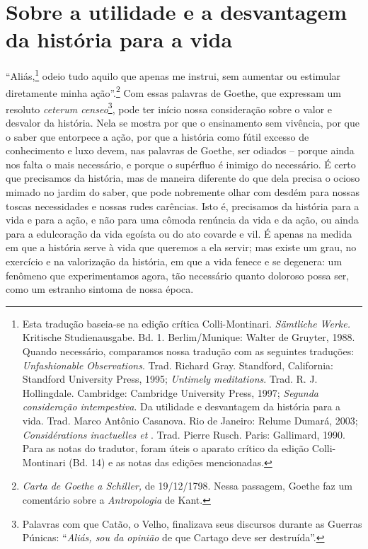 
\part{Sobre a utilidade e a desvantagem da história para a vida}



\label{prefuxe1cio}

``Aliás,\footnote{Esta tradução baseia-se na edição crítica
  Colli-Montinari. \emph{Sämtliche Werke.} Kritische Studienausgabe. Bd.
  1. Berlim/Munique: Walter de Gruyter, 1988. Quando necessário,
  comparamos nossa tradução com as seguintes traduções:
  \emph{Unfashionable Observations}. Trad. Richard Gray. Standford,
  California: Standford University Press, 1995; \emph{Untimely
  meditations}. Trad. R. J. Hollingdale. Cambridge: Cambridge University
  Press, 1997; \emph{Segunda consideração intempestiva}. Da
  utilidade e desvantagem da história para a vida. Trad. Marco
  Antônio Casanova. Rio de Janeiro:
  Relume Dumará, 2003; \emph{Considérations inactuelles  et }. Trad.
  Pierre Rusch. Paris: Gallimard, 1990. Para as notas do tradutor, foram
  úteis o aparato crítico da edição Colli-Montinari (Bd. 14) e as notas
  das edições mencionadas.} odeio tudo aquilo que apenas me instrui, sem
aumentar ou estimular diretamente minha ação''.\footnote{\emph{Carta de Goethe
  a Schiller,} de 19/12/1798. Nessa passagem, Goethe faz um comentário
  sobre a \emph{Antropologia} de Kant.} Com essas palavras de Goethe,
que expressam um resoluto \emph{ceterum censeo}\footnote{Palavras com
  que Catão, o Velho, finalizava seus discursos durante as Guerras
  Púnicas: ``\emph{Aliás, sou da opinião} de que Cartago deve ser
  destruída''.}, pode ter início nossa consideração sobre o valor e
desvalor da história. Nela se mostra por que o ensinamento sem vivência,
por que o saber que entorpece a ação, por que a história como fútil
excesso de conhecimento e luxo devem, nas palavras de Goethe, ser odiados
-- porque ainda nos falta o mais necessário, e porque o supérfluo é
inimigo do necessário. É certo que precisamos da história, mas de
maneira diferente do que dela precisa o ocioso mimado no jardim do
saber, que pode nobremente olhar com desdém para nossas toscas
necessidades e nossas rudes carências. Isto é, precisamos da história
para a vida e para a ação, e não para uma cômoda renúncia da vida e da
ação, ou ainda para a edulcoração da vida egoísta ou do ato covarde e
vil. É apenas na medida em que a história serve à vida que queremos a
ela servir; mas existe um grau, no exercício e na valorização da história,
em que a vida fenece e se degenera: um fenômeno que experimentamos
agora, tão necessário quanto doloroso possa ser, como um estranho
sintoma de nossa época.\label{sintomadenossaepoca}

